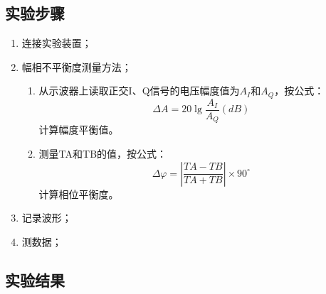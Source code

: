 \documentclass[12pt]{article}
\begin{document}
\subsection{实验步骤}
\begin{enumerate}
  \item 连接实验装置；
  \item 幅相不平衡度测量方法；
  \begin{enumerate}[(1).]
    \item 从示波器上读取正交I、Q信号的电压幅度值为$A_I$和$A_Q$，按公式：
    \begin{equation}
\Delta A=20\lg\frac{A_I}{A_Q}(dB)
    \end{equation}
        计算幅度平衡值。
  \item 测量TA和TB的值，按公式：
  \begin{equation}
 \Delta \varphi =\left|\frac{TA-TB}{TA+TB}\right|\times 90^\circ
  \end{equation}
    计算相位平衡度。
  \end{enumerate}
  \item 记录波形；
  \item 测数据；
\end{enumerate}
\subsection{实验结果}
\end{document}
